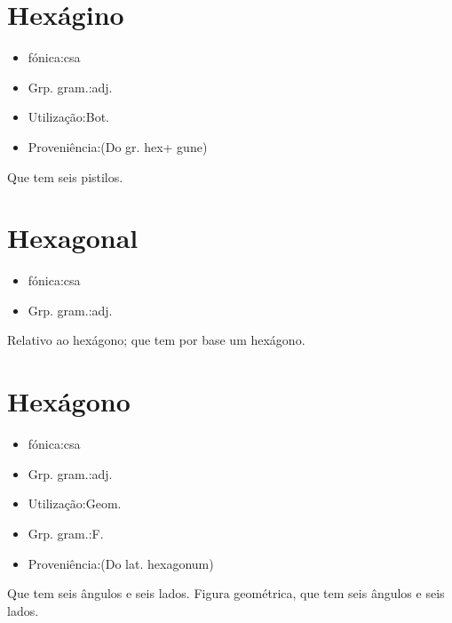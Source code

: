 \documentclass{article}
\begin{document}
\section{Hexágino}
\begin{itemize}
\item {fónica:csa}
\end{itemize}
\begin{itemize}
\item {Grp. gram.:adj.}
\end{itemize}
\begin{itemize}
\item {Utilização:Bot.}
\end{itemize}
\begin{itemize}
\item {Proveniência:(Do gr. \textunderscore hex\textunderscore  + \textunderscore gune\textunderscore )}
\end{itemize}
Que tem seis pistilos.
\section{Hexagonal}
\begin{itemize}
\item {fónica:csa}
\end{itemize}
\begin{itemize}
\item {Grp. gram.:adj.}
\end{itemize}
Relativo ao hexágono; que tem por base um hexágono.
\section{Hexágono}
\begin{itemize}
\item {fónica:csa}
\end{itemize}
\begin{itemize}
\item {Grp. gram.:adj.}
\end{itemize}
\begin{itemize}
\item {Utilização:Geom.}
\end{itemize}
\begin{itemize}
\item {Grp. gram.:F.}
\end{itemize}
\begin{itemize}
\item {Proveniência:(Do lat. \textunderscore hexagonum\textunderscore )}
\end{itemize}
Que tem seis ângulos e seis lados.
Figura geométrica, que tem seis ângulos e seis lados.
\end{document}
